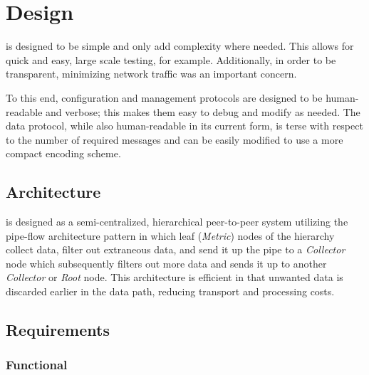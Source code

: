 \chapter{Design}
\label{design}

\dcamp is designed to be simple and only add complexity where needed. This allows for quick and easy, large scale
testing, for example. Additionally, in order to be transparent, minimizing network traffic was an important concern.

To this end, \dcamp configuration and management protocols are designed to be human-readable and verbose; this makes
them easy to debug and modify as needed. The data protocol, while also human-readable in its current form, is terse with
respect to the number of required messages and can be easily modified to use a more compact encoding scheme.

\section{Architecture}

\dcamp is designed as a semi-centralized, hierarchical peer-to-peer system utilizing the pipe-flow architecture
pattern\cite{needed} in which leaf (\textit{Metric}) nodes of the hierarchy collect data, filter out extraneous data,
and send it up the pipe to a \textit{Collector} node which subsequently filters out more data and sends it up to another
\textit{Collector} or \textit{Root} node. This architecture is efficient in that unwanted data is discarded earlier in
the data path, reducing transport and processing costs.

\section{Requirements}

\subsection{Functional}

